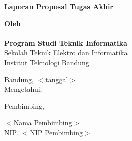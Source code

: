 \begin{center}
    \large{\MakeUppercase{\bfseries\thetitle}}

    \vspace{5em}

    \large{\bfseries Laporan Proposal Tugas Akhir}

    \vspace{3em}
    
    \normalsize{\textbf{Oleh}}\\ 
    \large{\bfseries \theauthor \\ Program Studi Teknik Informatika}\\
    
    \normalsize{Sekolah Teknik Elektro dan Informatika \\ Institut Teknologi Bandung}

    \vspace{5em}

    Bandung, $<$tanggal$>$\\

    Mengetahui,\\

    \vspace{2em}
    
    Pembimbing,\\

    \vspace{6em}

    \underline{$<$Nama Pembimbing$>$}\\
    NIP. $<$NIP Pembimbing$>$
    
\end{center}